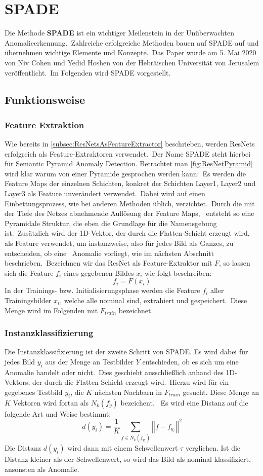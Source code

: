 \section{SPADE}\label{sec:SPADE}
Die Methode \textbf{SPADE} ist ein wichtiger Meilenstein in der Unüberwachten Anomalieerkennung.\
Zahlreiche erfolgreiche Methoden bauen auf SPADE auf und übernehmen wichtige Elemente und Konzepte.\
Das Paper wurde am 5. Mai 2020 von Niv Cohen und Yedid Hoshen von der Hebräischen Universität von Jerusalem veröffentlicht.\
Im Folgenden wird SPADE vorgestellt.\
\subsection{Funktionsweise}\label{subsec:SPADEFunktionsweise}
\subsubsection*{Feature Extraktion}
Wie bereits in \ref{subsec:ResNetsAsFeatureExtractor} beschrieben, werden ResNets erfolgreich als Feature-Extraktoren verwendet.\
Der Name \glqq SPADE\grqq{} steht hierbei für \glqq Semantic Pyramid Anomaly Detection\grqq{}. Betrachtet man \ref{fig:ResNetPyramid} wird klar warum von einer \glqq Pyramide\grqq{} gesprochen werden kann:\
Es werden die Feature Maps der einzelnen Schichten, konkret der Schichten \glqq Layer1, Layer2 und Layer3\grqq{} als Feature unverändert verwendet.\
Dabei wird auf einen Einbettungsprozess, wie bei anderen Methoden üblich, verzichtet.\ Durch die mit der Tiefe des Netzes abnehmende Auflösung der Feature Maps, \
entsteht so eine \glqq Pyramidale\grqq{} Struktur, die eben die Grundlage für die Namensgebung ist.\
Zusätzlich wird der 1D-Vektor, der durch die \glqq Flatten\grqq{}-Schicht erzeugt wird, als Feature verwendet, um instanzweise, also für jedes Bild als Ganzes, zu entscheiden, ob eine \
Anomalie vorliegt, wie im nächsten Abschnitt beschrieben.\
Bezeichnen wir das ResNet als Feature-Extraktor mit $F$, so lassen sich die Feature $f_{i}$ eines gegebenen Bildes $x_{i}$ wie folgt beschreiben:
$$f_{i} = F(x_{i})$$
In der Trainings- bzw. Initialisierungsphase werden die Feature $f_{i}$ aller Trainingsbilder $x_{i}$, welche alle nominal sind, extrahiert und gespeichert.\
Diese Menge wird im Folgenden mit $F_{train}$ bezeichnet.\
\subsubsection*{Instanzklassifizierung}
Die Instanzklassifizierung ist der zweite Schritt von SPADE. Es wird dabei für jedes Bild $y_{i}$ aus der Menge an Testbilder $Y$ entschieden, ob es sich um eine Anomalie handelt oder nicht.\
Dies geschieht ausschließlich anhand des 1D-Vektors, der durch die \glqq Flatten\grqq{}-Schicht erzeugt wird.\
Hierzu wird für ein gegebenes Testbild $y_{i}$, die $K$ nächsten Nachbarn in $F_{train}$ gesucht. Diese Menge an $K$ Vektoren wird fortan als $N_{k}(f_{y})$ bezeichent. \
Es wird eine Distanz auf die folgende Art und Weise bestimmt:
$$
d(y_{i}) = \frac{1}{K} \sum_{f\in N_{k}(f_{y_{i}})} \left|\left| f - f_{y_{i}} \right|\right|^{2}
$$
Die Distanz $d(y_{i})$ wird dann mit einem Schwellenwert $\tau$ verglichen. Ist die Distanz kleiner als der Schwellenwert, so wird das Bild als nominal klassifiziert, ansonsten als Anomalie.\
